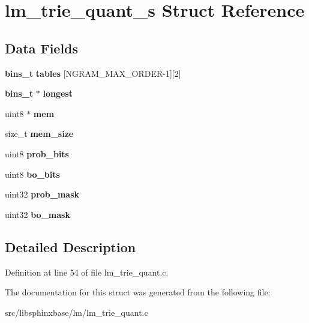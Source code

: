 \section{lm\-\_\-trie\-\_\-quant\-\_\-s Struct Reference}
\label{structlm__trie__quant__s}
\subsection*{Data Fields}
\begin{DoxyCompactItemize}
\item 
{\bf bins\-\_\-t} {\bfseries tables} [N\-G\-R\-A\-M\-\_\-\-M\-A\-X\-\_\-\-O\-R\-D\-E\-R-\/1][2]\label{structlm__trie__quant__s_a73fa4af73d4a3767d221921f71a95940}

\item 
{\bf bins\-\_\-t} $\ast$ {\bfseries longest}\label{structlm__trie__quant__s_a218f78c52d512605133668b765e3260b}

\item 
uint8 $\ast$ {\bfseries mem}\label{structlm__trie__quant__s_add104d4880f471d73fd886b2eae7ca66}

\item 
size\-\_\-t {\bfseries mem\-\_\-size}\label{structlm__trie__quant__s_a348c9280b8fccbac99890a5bf3a69d94}

\item 
uint8 {\bfseries prob\-\_\-bits}\label{structlm__trie__quant__s_a3696f006dc23c7faddd81419aae4de64}

\item 
uint8 {\bfseries bo\-\_\-bits}\label{structlm__trie__quant__s_a7d8ec82f7dde68d7a7e4ea495972bddc}

\item 
uint32 {\bfseries prob\-\_\-mask}\label{structlm__trie__quant__s_ad70aed4374709125a85a915815538a61}

\item 
uint32 {\bfseries bo\-\_\-mask}\label{structlm__trie__quant__s_a2b8c82b5f452346651055c0cd7a3b3f2}

\end{DoxyCompactItemize}


\subsection{Detailed Description}


Definition at line 54 of file lm\-\_\-trie\-\_\-quant.\-c.



The documentation for this struct was generated from the following file\-:\begin{DoxyCompactItemize}
\item 
src/libsphinxbase/lm/lm\-\_\-trie\-\_\-quant.\-c\end{DoxyCompactItemize}
